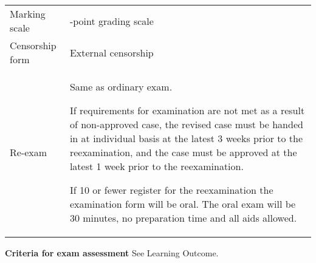 \begin{table}[t]
\begin{tabular}{ l | >{\raggedright\arraybackslash}p{\textwidth - 5.8cm} }
        Marking scale & 7-point grading scale \\ 

        Censorship form & External censorship \\ 

        Re-exam & Same as ordinary exam.

        If requirements for examination are not met as a result of non-approved case, the revised case must be handed in at individual basis at the latest 3 weeks prior to the reexamination, and the case must be approved at the latest 1 week prior to the reexamination.
        
        If 10 or fewer register for the reexamination the examination form will be oral. The oral exam will be 30 minutes, no preparation time and all aids allowed.
        
         \\ 
    \end{tabular}
\end{table}

\textbf{Criteria for exam assessment}
See Learning Outcome.
